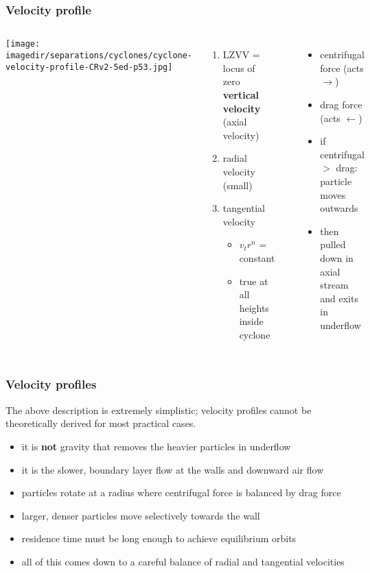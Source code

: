 \begin{frame}\frametitle{Velocity profile}
	\begin{columns}[c]
			\begin{center}
				\texttt{[image: \\imagedir/separations/cyclones/cyclone-velocity-profile-CRv2-5ed-p53.jpg]}
			\end{center}
			{}
			\begin{enumerate}
				\item	LZVV = locus of zero \textbf{vertical velocity} (axial velocity)
				\item	radial velocity (small)
				\item	tangential velocity
					\begin{itemize}
						\item	$v_t r^n$ = constant
						\item	true at all heights inside cyclone 
					\end{itemize}
			\end{enumerate}
			\hrule
			\begin{itemize}
				\item	centrifugal force (acts $\longrightarrow$)
				\item	drag force (acts $\longleftarrow$)
				\item	if centrifugal $>$ drag: particle moves outwards
				\item	then pulled down in axial stream and exits in underflow
			\end{itemize}
	\end{columns}	
\end{frame}

\begin{frame}\frametitle{Velocity profiles}
	\begin{exampleblock}{}
		The above description is extremely simplistic; velocity profiles cannot be theoretically derived for most practical cases.
	\end{exampleblock}
	
	\begin{itemize}
		\item	it is \textbf{not} gravity that removes the heavier particles in underflow
		\item	it is the slower, boundary layer flow at the walls and downward air flow
		\item	particles rotate at a radius where centrifugal force is balanced by drag force
		\item	larger, denser particles move selectively towards the wall
		\item	residence time must be long enough to achieve equilibrium orbits
		\item	all of this comes down to a careful balance of radial and tangential velocities
	\end{itemize}	
\end{frame}


